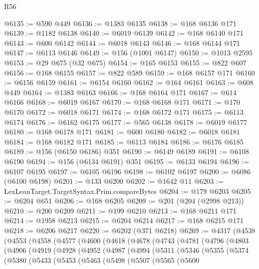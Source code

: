 \begin{lexlean}{R56}
\begin{coremodule}
{{{{{{{{{{{{{{{{{{{{{{{{{{{{{{{{{{{{{{{{{{{{{{{{{{{{{{{{{{{{{{{{{{{{{{{{{{{{{{{{{{{{{{{{{{{{{{{{{{{{{{{{{{{{{{{{{{{{{{{{{{{{{{{{{{{{{{{{{{{{{{{{{{{{{{{{{{{{{{{{{{{{{{{{{{{{{{{{{{{{{{{{{{{{{{{{{{{{{{{{{{{{{{{{{{{@6135 := @590 @449
@6136 := @1383 @6135
@6138 := @168 @6136 @171
@6139 := @1182 @6138
@6140 := @6019 @6139
@6142 := @168 @6140 @171
@6143 := @600 @6142
@6144 := @6018 @6143
@6146 := @168 @6144 @171
@6147 := @6113 @6146
@6149 := @156 (@1001 @6147)
@6150 := @1013 @2595
@6153 := @29 @675 (@32 @675)
@6154 := @165 @6153
@6155 := @822 @607
@6156 := @168 @6155
@6157 := @822 @589
@6159 := @168 @6157 @171
@6160 := @6156 @6159
@6161 := @6154 @6160
@6162 := @164 @6161
@6163 := @608 @449
@6164 := @1383 @6163
@6166 := @168 @6164 @171
@6167 := @614 @6166
@6168 := @6019 @6167
@6170 := @168 @6168 @171
@6171 := @170 @6170
@6172 := @6018 @6171
@6174 := @168 @6172 @171
@6175 := @6113 @6174
@6176 := @6162 @6175
@6177 := @565 @6138
@6178 := @6019 @6177
@6180 := @168 @6178 @171
@6181 := @600 @6180
@6182 := @6018 @6181
@6184 := @168 @6182 @171
@6185 := @6113 @6184
@6186 := @6176 @6185
@6189 := @156 (@6150 @6186) @351
@6190 := @6149 @6189
@6191 := @6108 @6190
@6194 := @156 (@6134 @6191) @351
@6195 := @6133 @6194
@6196 := @6107 @6195
@6197 := @6105 @6196
@6198 := @6102 @6197
@6200 := @6086 (@6100 @6198)
@6201 := @133 @6200
@6202 := @1642 @11
@6203 := LexLeanTarget.TargetSyntax.Prim.compareBytes
@6204 := @179 @6203
@6205 := @6204 @651
@6206 := @168 @6205
@6209 := @201 (@204 (@2998 @213))
@6210 := @200 @6209
@6211 := @199 @6210
@6213 := @168 @6211 @171
@6214 := @1958 @6213
@6215 := @6204 @6214
@6217 := @168 @6215 @171
@6218 := @6206 @6217
@6220 := @6202 (@371 @6218)
@6269 := @4317
    (@4538
      (@4553
        (@4558
          (@4577
            (@4600
              (@4618
                (@4678
                  (@4743
                    (@4781
                      (@4796
                        (@4803
                          (@4906
                            (@4919
                              (@4928
                                (@4952
                                  (@4987
                                    (@4994
                                      (@5311
                                        (@5346
                                          (@5355
                                            (@5374
                                              (@5380
                                                (@5433
                                                  (@5453
                                                    (@5463
                                                      (@5498
                                                        (@5507
                                                          (@5565
                                                            (@5600
}}}}}}}}}}}}}}}}}}}}}}}}}}}}}}}}}}}}}}}}}}}}}}}}}}}}}}}}}}}}}}}}}}}}}}}}}}}}}}}}}}}}}}}}}}}}}}}}}}}}}}}}}}}}}}}}}}}}}}}}}}}}}}}}}}}}}}}}}}}}}}}}}}}}}}}}}}}}}}}}}}}}}}}}}}}}}}}}}}}}}}}}}}}}}}}}}}}}}}}}}}}}}}}}}}}
\end{coremodule}
\end{lexlean}
